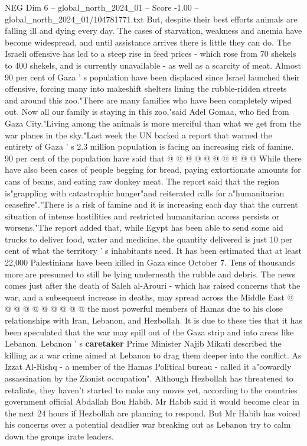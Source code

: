 \begin{textsample}{NEG Dim 6 – global\_north\_2024\_01 – Score -1.00 – global\_north\_2024\_01/104781771.txt}  \label{ex:f6_neg_364}
But, despite their best efforts animals are falling ill and dying every day.
The cases of starvation, weakness and anemia have become widespread, and until assistance arrives there is little they can do.
The Israeli offensive has led to a steep rise in feed prices - which rose from 70 shekels to 400 shekels, and is currently unavailable - as well as a scarcity of meat.
Almost 90 per cent of Gaza ' s population have been displaced since Israel launched their offensive, forcing many into makeshift shelters lining the rubble-ridden streets and around this zoo."There are many families who have been completely wiped out.
Now all our family is staying in this zoo,"said Adel Gomaa, who fled from Gaza City."Living among the animals is more merciful than what we get from the war planes in the sky."Last week the UN backed a report that warned the entirety of Gaza ' s 2.3 million population is facing an increasing risk of famine. 90 per cent of the population have said that @ @ @ @ @ @ @ @ @ @ While there have also been cases of people begging for bread, paying extortionate amounts for cans of beans, and eating raw donkey meat.
The report said that the region is"grappling with catastrophic hunger"and reiterated calls for a"humanitarian ceasefire"."There is a risk of famine and it is increasing each day that the current situation of intense hostilities and restricted humanitarian access persists or worsens."The report added that, while Egypt has been able to send some aid trucks to deliver food, water and medicine, the quantity delivered is just 10 per cent of what the territory ' s inhabitants need.
It has been estimated that at least 22,000 Palestinians have been killed in Gaza since October 7.
Tens of thousands more are presumed to still be lying underneath the rubble and debris.
The news comes just after the death of Saleh al-Arouri - which has raised concerns that the war, and a subsequent increase in deaths, may spread across the Middle East @ @ @ @ @ @ @ @ @ @ the most powerful members of Hamas due to his close relationships with Iran, Lebanon, and Hezbollah.
It is due to these ties that it has been speculated that the war may spill out of the Gaza strip and into areas like Lebanon.
Lebanon ' s \textbf{caretaker} Prime Minister Najib Mikati described the killing as a war crime aimed at Lebanon to drag them deeper into the conflict.
As Izzat Al-Rishq - a member of the Hamas Political bureau - called it a"cowardly assassination by the Zionist occupation".
Although Hezbollah has threatened to retaliate, they haven't started to make any moves yet, according to the countries government official Abdallah Bou Habib.
Mr Habib said it would become clear in the next 24 hours if Hezbollah are planning to respond.
But Mr Habib has voiced his concerns over a potential deadlier war breaking out as Lebanon try to calm down the groups irate leaders.

\end{textsample}
